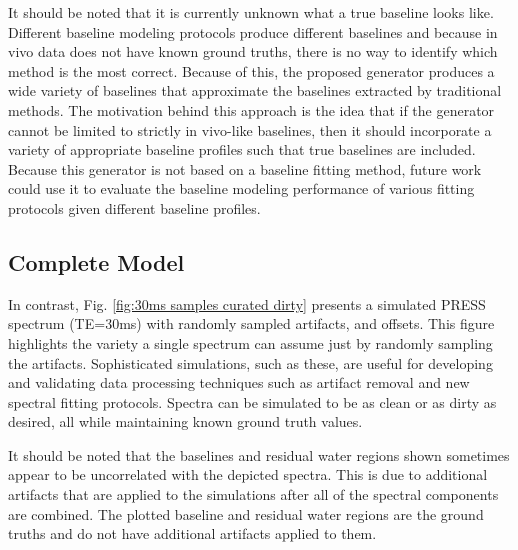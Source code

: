 It should be noted that it is currently unknown what a true baseline looks like. Different baseline modeling protocols produce different baselines and because in vivo data does not have known ground truths, there is no way to identify which method is the most correct. Because of this, the proposed generator produces a wide variety of baselines that approximate the baselines extracted by traditional methods. The motivation behind this approach is the idea that if the generator cannot be limited to strictly in vivo-like baselines, then it should incorporate a variety of appropriate baseline profiles such that true baselines are included. Because this generator is not based on a baseline fitting method, future work could use it to evaluate the baseline modeling performance of various fitting protocols given different baseline profiles.

\subsection{Complete Model}
In contrast, Fig. \ref{fig:30ms samples curated dirty} presents a simulated PRESS spectrum (TE=30ms) with randomly sampled artifacts, and offsets. %
This figure highlights the variety a single spectrum can assume just by randomly sampling the artifacts. Sophisticated simulations, such as these, are useful for developing and validating data processing techniques such as artifact removal and new spectral fitting protocols. Spectra can be simulated to be as clean or as dirty as desired, all while maintaining known ground truth values. %



It should be noted that the baselines and residual water regions shown sometimes appear to be uncorrelated with the depicted spectra. This is due to additional artifacts that are applied to the simulations after all of the spectral components are combined. The plotted baseline and residual water regions are the ground truths and do not have additional artifacts applied to them. %


